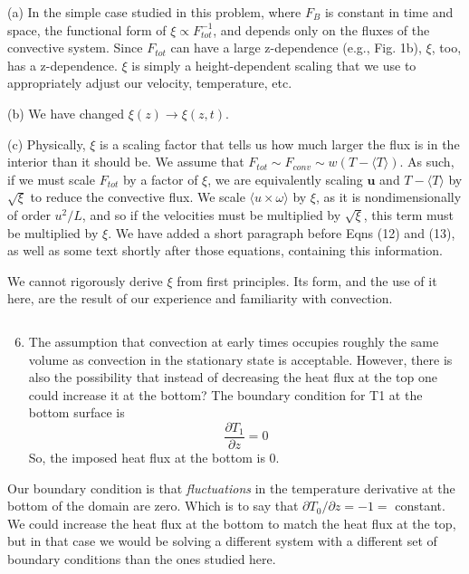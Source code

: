 \documentclass[aps, 11pt, singlecolumn]{revtex4-1} %
\begin{document}
\begin{singlespace}
(a) In the simple case studied in this problem, where $F_B$ is constant in time
and space, the functional form of $\xi \propto F_{tot}^{-1}$, and depends only
on the fluxes of the convective system. Since $F_{tot}$ can
have a large z-dependence (e.g., Fig. 1b), $\xi$, too, has a z-dependence. 
$\xi$ is simply a height-dependent scaling that we use to appropriately
adjust our velocity, temperature, etc.

(b) We have changed $\xi(z) \rightarrow \xi(z, t)$.

(c) Physically, $\xi$ is a scaling factor that tells us how much larger the flux
is in the interior than it should be. 
We assume that $F_{tot} \sim F_{conv} \sim w (T - \langle T \rangle )$.
As such, if we must scale $F_{tot}$ by a factor of $\xi$, we are equivalently
scaling
$\bm{u}$ and $T - \langle T\rangle$ by $\sqrt{\xi}$ to reduce the convective flux.
We scale $\langle u\times \omega\rangle$ by $\xi$, as it is
nondimensionally of order $u^2 / L$, and so if the velocities must be multiplied
by $\sqrt{\xi}$, this term must be multiplied by $\xi$. We have added a short
paragraph before Eqns (12) and (13), as well as some text shortly after those
equations, containing this information.

We cannot rigorously derive $\xi$ from first principles. Its form, and the use of
it here, are the result of our experience and familiarity with convection. 

\begin{myquotation}
$\,$\\\vspace{-1.25cm}
\begin{enumerate}
\setcounter{enumi}{5}
\item The assumption that convection at early times occupies roughly the same volume as convection in the stationary state is acceptable. However, there is also the possibility that instead of decreasing the heat flux at the top one could increase it at the bottom? The boundary condition for T1 at the bottom surface is
$$
\frac{\partial T_1}{\partial z} = 0
$$
So, the imposed heat flux at the bottom is 0.
\end{enumerate}
\end{myquotation}
Our boundary condition is that \emph{fluctuations} in the temperature derivative at the
bottom of the domain are zero. Which is to say that 
$\partial T_0 / \partial z = -1 =$ constant. We could increase the heat flux at
the bottom to match the heat flux at the top, but in that case we would be solving
a different system with a different set of boundary conditions than the ones
studied here. 


\end{singlespace}
\end{document}
